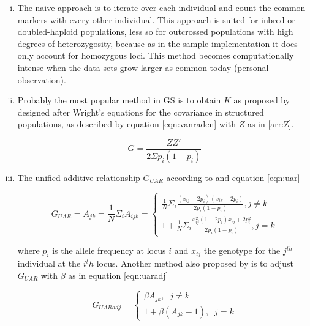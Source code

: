 \begin{enumerate}[(i)]
\item The naive approach is to iterate over each individual and count the common markers
  with every other individual. This approach is suited for inbred or doubled-haploid
  populations, less so for outcrossed populations with high degrees of heterozygosity,
  because as in the sample implementation it does only account for homozygous loci. This
  method becomes computationally intense when the data sets grow larger as common today
  (personal observation).
\item Probably the most popular method in GS is to obtain $K$ as proposed by
  \cite{vanraden2008efficient} designed after Wright's \cite{wright1922coefficients}
  equations for the covariance in structured populations, as described by equation
  \ref{eqn:vanraden} with $Z$ as in \ref{arr:Z}.

\begin{equation}
 G = \frac{ZZ'}{2 \Sigma p_i (1-p_i)} 
\label{eqn:vanraden}
\end{equation}

\item The unified additive relationship $G_{UAR}$ according to \cite{yang2010common} and equation \ref{eqn:uar}

\begin{equation}
 G_{UAR} = A_{jk} = \frac{1}{N} \Sigma_i{A_{ijk}} = \left\{
  \!\begin{aligned}
   \frac{1}{N} \Sigma_{i} \frac{(x_{ij} - 2p_i)(x_{ik} - 2p_i)}{2p_i (1-p_i)}, j \ne k \\
   1 + \frac{1}{N} \Sigma_i \frac{x_{ij}^2 (1+2p_i) x_{ij} + 2p_i^2 }{2p_i (1-p_i)}, j = k   
  \end{aligned}
 \right.
 \label{eqn:uar}
\end{equation}

where $p_i$ is the allele frequency at locus $i$ and $x_{ij}$ the genotype for the
$j^{th}$ individual at the $i^th$ locus. Another method also proposed by
\cite{yang2010common} is to adjust $G_{UAR}$ with $\beta$ as in equation \ref{eqn:uaradj}

\begin{equation}
 G_{UARadj} = \left\{
  \!\begin{aligned}
   \beta A_{jk}, \;\; j \ne k \\
   1 + \beta (A_{jk}-1 ), \;\; j = k   
  \end{aligned}
  \right.
 \label{eqn:uaradj}
\end{equation}


\end{enumerate}
